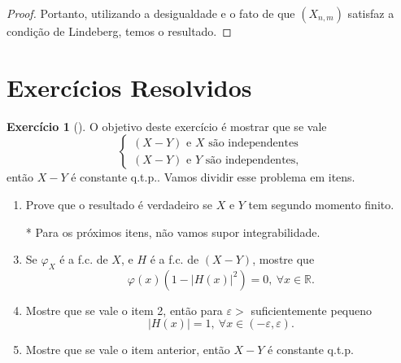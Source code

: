 \documentclass[12pt,a4paper,oneside]{book}
\theoremstyle{definition}
\newtheorem{xca}[theorem]{Exerc\'icio}
\theoremstyle{remark}
\numberwithin{equation}{section}
\newcommand{\R}{\mathbb{R}}
\newcommand{\e}{\varepsilon}
\begin{document}
\begin{proof}
Portanto, utilizando a desigualdade e o fato de que $(X_{n,m})$  satisfaz a condição de Lindeberg, temos o resultado.






















\end{proof}










































\newpage
\section{Exercícios Resolvidos}

\begin{xca}[\cite{chaumont_yor_2012}] O objetivo deste exercício é mostrar que se vale
$$\begin{cases}
(X-Y) \text{ e } X \textrm{ são independentes}\\
(X-Y) \text{ e } Y \textrm{ são independentes}, 
\end{cases}
$$
então $X-Y$ é constante q.t.p.. Vamos dividir esse problema em itens.

\begin{enumerate}
\item Prove que o resultado é verdadeiro se $X$ e $Y$ tem segundo momento finito.

\item[*] Para os próximos itens, não vamos supor integrabilidade.

\item  Se $\varphi_X$ é a f.c. de $X$, e $H$ é a f.c. de $(X-Y)$, mostre que 
$$\varphi(x)(1-|H(x)|^2)=0,\ \forall x\in \R. $$
\item Mostre que se vale o item 2, então para $\e>$ suficientemente pequeno
$$|H(x)|=1,\ \forall x\in (-\e,\e). $$
\item Mostre que se vale o item anterior, então $X-Y$ é constante q.t.p. 
\end{enumerate}
\end{xca}
\end{document}

